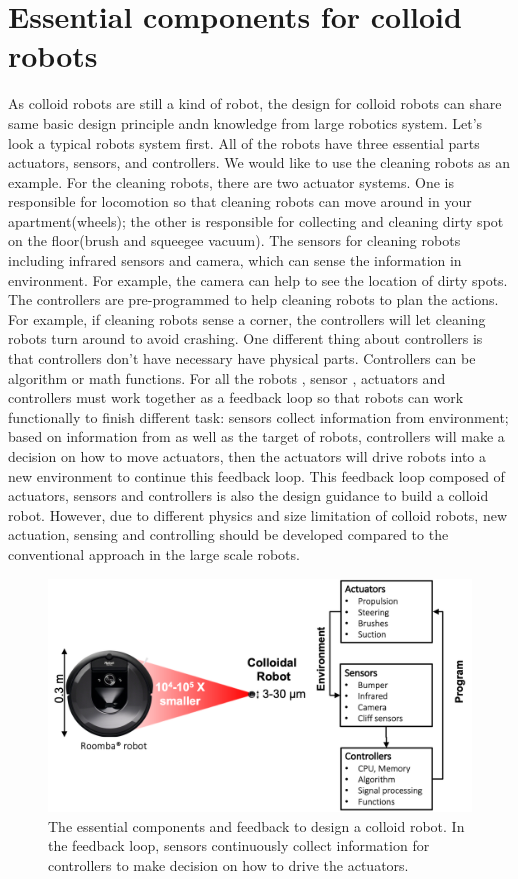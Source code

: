 \section{Essential components for colloid robots}
As colloid robots are still a kind of robot, the design for colloid robots can share same basic design principle andn knowledge from large robotics system.  Let’s look a typical robots system first. All of the robots have three essential parts actuators, sensors, and controllers. We would like to use the cleaning robots as an example.  For the cleaning robots,  there are two actuator systems. One is responsible for locomotion so that cleaning robots can move around in your apartment(wheels); the other is responsible for collecting and cleaning dirty spot on the floor(brush and squeegee vacuum).
The sensors for cleaning robots including infrared  sensors and camera, which can sense the information in environment. For example, the camera can help to see the location of dirty spots. The controllers are pre-programmed  to help cleaning robots to plan  the actions. For example, if cleaning robots sense a corner, the controllers will let cleaning robots turn around to avoid crashing. One different thing about controllers is that controllers don't have necessary have physical parts. Controllers can be algorithm or math functions.  For all the robots , sensor , actuators and controllers must work together as a feedback loop so that  robots can work functionally to finish different task: sensors collect information from environment; based on information from  as well as the target of robots,  controllers will make a decision  on how to move actuators, then the actuators will drive robots into a new environment to continue this feedback loop. This feedback loop composed of actuators, sensors and controllers is also the design guidance to build a colloid robot. However, due to different physics and size limitation of colloid robots, new actuation, sensing and controlling should be developed compared to the conventional approach in the large scale robots.  

\begin{figure}
\centering
\includegraphics[width=12cm]{figures/1_2.png}
\caption{The essential components and feedback to design a colloid robot. In the feedback loop, sensors continuously collect information for controllers to make decision on how to drive the actuators.}
\label{fig:1.2}
\end{figure}

